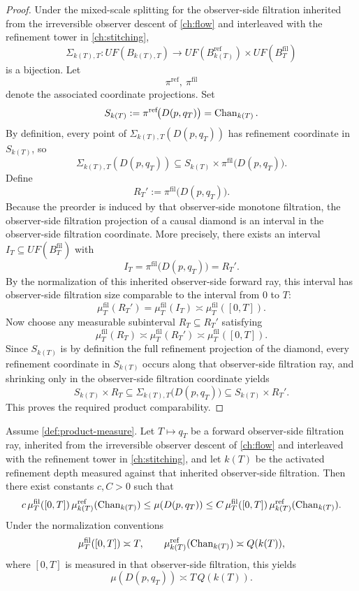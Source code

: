 \begin{proof}
	Under the mixed-scale splitting for the observer-side filtration
	inherited from the irreversible observer descent of
	\cref{ch:flow} and interleaved with the refinement tower in
	\cref{ch:stitching},
	\[
		\Sigma_{k(T),T}:UF(B_{k(T),T})
		\longrightarrow
		UF(B_{k(T)}^{\mathrm{ref}})\times UF(B_T^{\mathrm{fil}})
	\]
	is a bijection.  Let
	\[
		\pi^{\mathrm{ref}},\ \pi^{\mathrm{fil}}
	\]
	denote the associated coordinate projections.
	Set
	\[
		S_{k(T)}:=\pi^{\mathrm{ref}}\!\bigl(D(p,q_T)\bigr)=\operatorname{Chan}_{k(T)}.
	\]
	By definition, every point of \(\Sigma_{k(T),T}(D(p,q_T))\) has
	refinement coordinate in \(S_{k(T)}\), so
	\[
		\Sigma_{k(T),T}(D(p,q_T))
		\subseteq
		S_{k(T)}\times \pi^{\mathrm{fil}}\!\bigl(D(p,q_T)\bigr).
	\]
	Define
	\[
		R_T':=\pi^{\mathrm{fil}}\!\bigl(D(p,q_T)\bigr).
	\]
	Because the preorder is induced by that observer-side monotone
	filtration, the observer-side filtration projection of a causal
	diamond is an interval in the observer-side filtration coordinate.
	More precisely, there exists an interval
	\(I_T\subseteq UF(B_T^{\mathrm{fil}})\) with
	\[
		I_T=\pi^{\mathrm{fil}}\!\bigl(D(p,q_T)\bigr)=R_T'.
	\]
	By the normalization of this inherited observer-side forward ray,
	this interval has observer-side filtration size comparable to the
	interval from \(0\) to \(T\):
	\[
		\mu_T^{\mathrm{fil}}(R_T')
		=
		\mu_T^{\mathrm{fil}}(I_T)
		\asymp
		\mu_T^{\mathrm{fil}}([0,T]).
	\]
	Now choose any measurable subinterval \(R_T\subseteq R_T'\) satisfying
	\[
		\mu_T^{\mathrm{fil}}(R_T)\asymp \mu_T^{\mathrm{fil}}(R_T')
		\asymp \mu_T^{\mathrm{fil}}([0,T]).
	\]
	Since \(S_{k(T)}\) is by definition the full refinement projection
	of the diamond, every refinement coordinate in \(S_{k(T)}\) occurs
	along that observer-side filtration ray, and shrinking only in the
	observer-side filtration coordinate yields
	\[
		S_{k(T)}\times R_T
		\subseteq
		\Sigma_{k(T),T}\bigl(D(p,q_T)\bigr)
		\subseteq
		S_{k(T)}\times R_T'.
	\]
	This proves the required product comparability.
\end{proof}
\begin{theorem}
	\label{thm:derived-coarse}
	Assume \cref{def:product-measure}.  Let \(T\mapsto q_T\) be a
	forward observer-side filtration ray, inherited from the
	irreversible observer descent of \cref{ch:flow} and interleaved
	with the refinement tower in \cref{ch:stitching}, and let \(k(T)\)
	be the activated refinement depth measured against that inherited
	observer-side filtration.  Then there exist constants \(c,C>0\)
	such that
	\[
		c\,\mu_T^{\mathrm{fil}}([0,T])\,
		\mu_{k(T)}^{\mathrm{ref}}(\operatorname{Chan}_{k(T)})
		\le
		\mu(D(p,q_T))
		\le
		C\,\mu_T^{\mathrm{fil}}([0,T])\,
		\mu_{k(T)}^{\mathrm{ref}}(\operatorname{Chan}_{k(T)}).
	\]
	Under the normalization conventions
	\[
		\mu_T^{\mathrm{fil}}([0,T])\asymp T,
		\qquad
		\mu_{k(T)}^{\mathrm{ref}}(\operatorname{Chan}_{k(T)})\asymp Q(k(T)),
	\]
	where \([0,T]\) is measured in that observer-side filtration, this
	yields
	\[
		\mu(D(p,q_T))\asymp T\,Q(k(T)).
	\]
\end{theorem}
